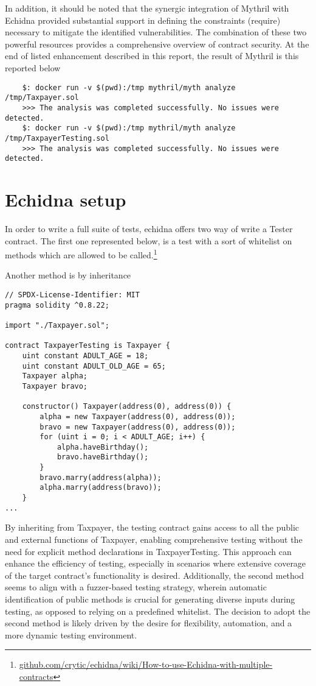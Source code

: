 \documentclass{article}
\begin{document}
In addition, it should be noted that the synergic integration of Mythril with Echidna provided substantial support in defining the constraints (require) necessary to mitigate the identified vulnerabilities. The combination of these two powerful resources provides a comprehensive overview of contract security.
At the end of listed enhancement described in this report, the result of Mythril is this reported below
\begin{verbatim}
    $: docker run -v $(pwd):/tmp mythril/myth analyze /tmp/Taxpayer.sol
    >>> The analysis was completed successfully. No issues were detected.
    $: docker run -v $(pwd):/tmp mythril/myth analyze /tmp/TaxpayerTesting.sol
    >>> The analysis was completed successfully. No issues were detected.
\end{verbatim}

\section{Echidna setup}
In order to write a full suite of tests, echidna offers two way of write a Tester contract. The first one represented below, is a test with a sort of whitelist on methods which are allowed to be called.\footnote{\href{https://github.com/crytic/echidna/wiki/How-to-use-Echidna-with-multiple-contracts}{github.com/crytic/echidna/wiki/How-to-use-Echidna-with-multiple-contracts}}

Another method is by inheritance
\begin{verbatim}
// SPDX-License-Identifier: MIT
pragma solidity ^0.8.22;

import "./Taxpayer.sol"; 

contract TaxpayerTesting is Taxpayer {
    uint constant ADULT_AGE = 18;
    uint constant ADULT_OLD_AGE = 65;
    Taxpayer alpha;
    Taxpayer bravo;

    constructor() Taxpayer(address(0), address(0)) {
        alpha = new Taxpayer(address(0), address(0));
        bravo = new Taxpayer(address(0), address(0));
        for (uint i = 0; i < ADULT_AGE; i++) {
            alpha.haveBirthday();
            bravo.haveBirthday();
        }
        bravo.marry(address(alpha));
        alpha.marry(address(bravo));
    }
...
\end{verbatim}
By inheriting from Taxpayer, the testing contract gains access to all the public and external functions of Taxpayer, enabling comprehensive testing without the need for explicit method declarations in TaxpayerTesting. This approach can enhance the efficiency of testing, especially in scenarios where extensive coverage of the target contract's functionality is desired. Additionally, the second method seems to align with a fuzzer-based testing strategy, wherein automatic identification of public methods is crucial for generating diverse inputs during testing, as opposed to relying on a predefined whitelist. The decision to adopt the second method is likely driven by the desire for flexibility, automation, and a more dynamic testing environment.
\end{document}
